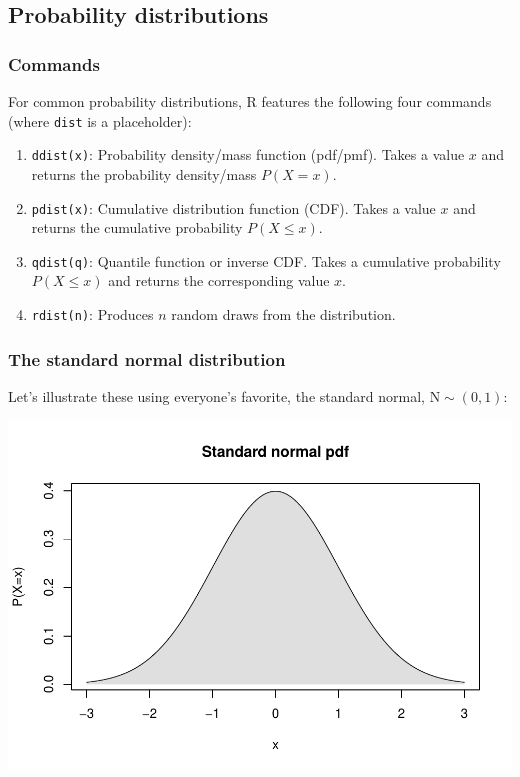\documentclass[
  11pt,
]{article}
\providecommand{\tightlist}{%
  \setlength{\itemsep}{0pt}\setlength{\parskip}{0pt}}
\begin{document}
\hypertarget{probability-distributions}{%
\subsection{Probability distributions}\label{probability-distributions}}

\hypertarget{commands}{%
\subsubsection{Commands}\label{commands}}

For common probability distributions, R features the following four commands (where \texttt{dist} is a placeholder):

\begin{enumerate}
\def\labelenumi{\arabic{enumi}.}
\tightlist
\item
  \texttt{ddist(x)}: Probability density/mass function (pdf/pmf). Takes a value \(x\) and returns the probability density/mass \(P(X=x)\).\\
\item
  \texttt{pdist(x)}: Cumulative distribution function (CDF). Takes a value \(x\) and returns the cumulative probability \(P(X \leq x)\).
\item
  \texttt{qdist(q)}: Quantile function or inverse CDF. Takes a cumulative probability \(P(X \leq x)\) and returns the corresponding value \(x\).
\item
  \texttt{rdist(n)}: Produces \(n\) random draws from the distribution.
\end{enumerate}

\hypertarget{the-standard-normal-distribution}{%
\subsubsection{The standard normal distribution}\label{the-standard-normal-distribution}}

Let's illustrate these using everyone's favorite, the standard normal, \(\text{N} \sim (0, 1)\):

\begin{center}\includegraphics{01-lec-short_files/figure-latex/stdnorm-1-1} \end{center}
\end{document}
